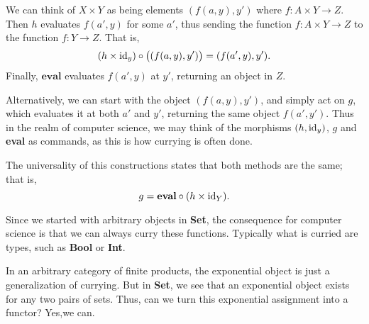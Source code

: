 \begin{example}
        We can think of $X \times Y$ as being elements $(f(a, y),
        y')$ where $f: A \times Y \to Z$. Then $h$ evaluates $f(a',y)$ for
        some $a'$, thus sending the function $f: A \times Y \to Z$ to the 
        function $f:Y \to Z$. That is, 
        \[
            (h \times \operatorname{\mathrm{id}}_y) \circ \big( (f(a, y), y') \big) = (f(a', y), 
            y').
        \]
        Finally, $\textbf{eval}$ evaluates $f(a', y)$
        at $y'$, returning an object in $Z$.

        Alternatively, we can start with the object $(f(a, y), y')$, and
        simply act on $g$, which evaluates it at both $a'$ and $y'$,
        returning the same object $f(a', y')$. 
        Thus in the realm of computer science, we may think of the
        morphisms $(h, \operatorname{\mathrm{id}}_y)$, $g$ and \textbf{eval} as commands, as this
        is how currying is often done. 

        The universality of this constructions states that both methods
        are the same; that is, 
        \[
            g = \textbf{eval}\circ (h \times \operatorname{\mathrm{id}}_Y).
        \]

        Since we started with arbitrary objects in \textbf{Set}, the
        consequence for computer science is that we can always curry
        these functions. Typically what is curried are types, such as 
        \textbf{Bool} or \textbf{Int}. 
    \end{example}

    In an arbitrary category of finite products, the exponential
    object is just a generalization of currying. But in \textbf{Set},
    we see that an exponential object exists for any two pairs of
    sets. Thus, can we turn this exponential assignment into a
    functor? Yes,we can. 


